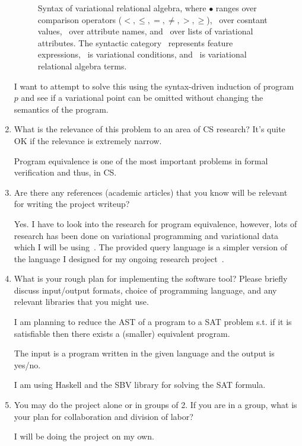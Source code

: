 \documentclass[sigconf]{acmart}
\begin{document}
\begin{enumerate}
\begin{figure}
\caption{Syntax of variational relational algebra, where $\bullet$ ranges over
comparison operators ($<, \leq, =, \neq, >, \geq$), \cte\ over cosntant values,
\att\ over attribute names, and \vAttList\ over lists of variational attributes.
The syntactic category \dimMeta\ represents feature expressions, \vCond\
is variational conditions, and \vQ\ is variational relational algebra terms.}
\label{fig:v-alg-def}
\end{figure}

I want to attempt to solve this using the syntax-driven induction of program $p$ and see if a variational point can be omitted without changing the semantics of the program. 


\item
What is the relevance of this problem to an area of CS research? It's quite OK if the relevance is extremely narrow.

Program equivalence is one of the most important problems in formal verification and thus, in CS.

\item 
Are there any references (academic articles) that you know will be relevant for writing the project writeup?

Yes. I have to look into the research for program equivalence, however, lots of research has been done on variational programming and variational data which I will be using~\cite{EWC13fosd,Walk14onward,MMWWK17vamos,Walk14onward}.
The provided query language is a simpler version of the language I designed for my ongoing research project~\cite{ATW18poly,ATW17dbpl}.

\item
What is your rough plan for implementing the software tool? Please briefly discuss input/output formats, choice of programming language, and any relevant libraries that you might use.

I am planning to reduce the AST of a program to a SAT problem s.t. if it is satisfiable then there exists a (smaller) equivalent program. 

The input is a program written in the given language and the output is yes/no. 

I am using Haskell and the SBV library for solving the SAT formula.

\item 
You may do the project alone or in groups of 2. If you are in a group, what is your plan for collaboration and division of labor?

I will be doing the project on my own.

\end{enumerate}



\end{document}
